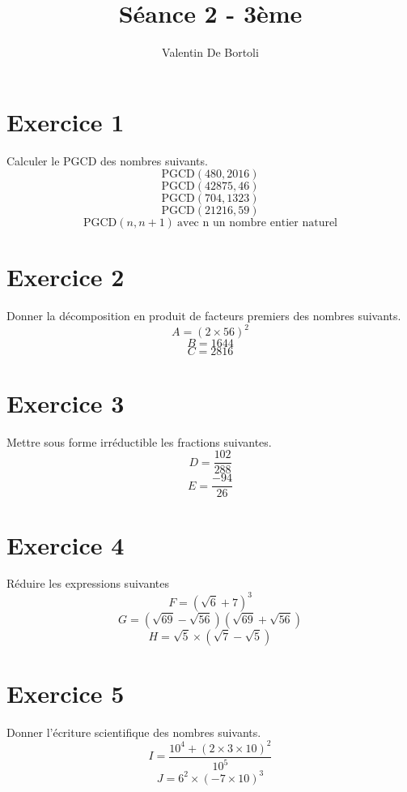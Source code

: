 \documentclass[10pt,a4paper]{article}
\title{Séance 2 - 3ème}
\author{Valentin De Bortoli}
\begin{document}
\maketitle
\section{Exercice 1}
Calculer le PGCD des nombres suivants.
\begin{equation}
\text{PGCD}(480,2016)
\end{equation}
\begin{equation}
\text{PGCD}(42875,46)
\end{equation}
\begin{equation}
\text{PGCD}(704,1323)
\end{equation}
\begin{equation}
\text{PGCD}(21216,59)
\end{equation}
\begin{equation}
\text{PGCD}(n,n+1) \ \text{avec n un nombre entier naturel}
\end{equation}
\section{Exercice 2}
Donner la décomposition en produit de facteurs premiers des nombres suivants.
\begin{equation}
A=(2 \times 56)^2
\end{equation}
\begin{equation}
B=1644
\end{equation}
\begin{equation}
C=2816
\end{equation}
\section{Exercice 3}
Mettre sous forme irréductible les fractions suivantes.
\begin{equation}
D=\frac{102}{288}
\end{equation}
\begin{equation}
E=\frac{-94}{26}
\end{equation}
\section{Exercice 4}
Réduire les expressions suivantes
\begin{equation}
F=(\sqrt{6}+7)^3
\end{equation}
\begin{equation}
G=(\sqrt{69}-\sqrt{56})(\sqrt{69}+\sqrt{56})
\end{equation}
\begin{equation}
H=\sqrt{5}\times (\sqrt{7}-\sqrt{5})
\end{equation}
\section{Exercice 5}
Donner l'écriture scientifique des nombres suivants.
\begin{equation}
I=\frac{10^4+(2\times 3 \times 10)^2}{10^5}
\end{equation}
\begin{equation}
J=6^2 \times (-7 \times 10)^3
\end{equation}
\end{document}
